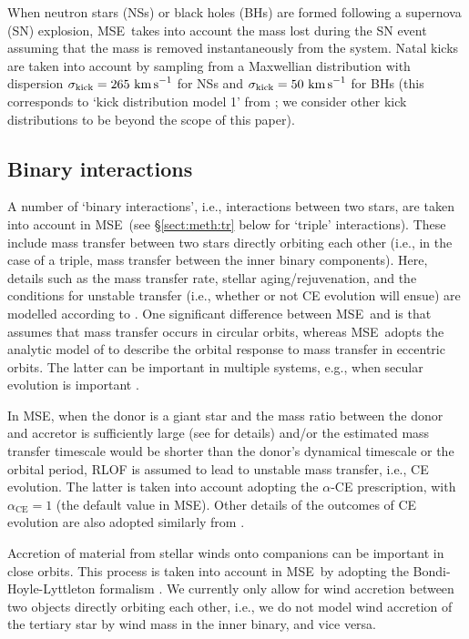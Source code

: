 \documentclass[twocolumn,appendixfloats,tighten]{aastex631}
\newcommand{\kms}{\, {\rm km\, s}^{-1}}
\newcommand{\mse}{\textsc{MSE}}
\begin{document}
When neutron stars (NSs) or black holes (BHs) are formed following a supernova (SN) explosion, \mse~takes into account the mass lost during the SN event assuming that the mass is removed instantaneously from the system. Natal kicks are taken into account by sampling from a Maxwellian distribution with dispersion $\sigma_{\mathrm{kick}} = 265\,\kms$ for NSs \citep{2005MNRAS.360..974H} and $\sigma_{\mathrm{kick}} = 50\,\kms$ for BHs (this corresponds to `kick distribution model 1' from \citealt{2021MNRAS.502.4479H}; we consider other kick distributions to be beyond the scope of this paper).


\subsection{Binary interactions}
\label{sect:meth:bin}
A number of `binary interactions', i.e., interactions between two stars, are taken into account in \mse~(see \S\ref{sect:meth:tr} below for `triple' interactions). These include mass transfer between two stars directly orbiting each other (i.e., in the case of a triple, mass transfer between the inner binary components). Here, details such as the mass transfer rate, stellar aging/rejuvenation, and the conditions for unstable transfer (i.e., whether or not CE evolution will ensue) are modelled according to \citet{2002MNRAS.329..897H}. One significant difference between \mse~and \citet{2002MNRAS.329..897H} is that \citet{2002MNRAS.329..897H} assumes that mass transfer occurs in circular orbits, whereas \mse~adopts the analytic model of \citet{2019ApJ...872..119H} to describe the orbital response to mass transfer in eccentric orbits. The latter can be important in multiple systems, e.g., when secular evolution is important \citep[e.g.,][]{2020A&A...640A..16T}.

In \mse, when the donor is a giant star and the mass ratio between the donor and accretor is sufficiently large (see \citealt{2002MNRAS.329..897H} for details) and/or the estimated mass transfer timescale would be shorter than the donor's dynamical timescale or the orbital period, RLOF is assumed to lead to unstable mass transfer, i.e., CE evolution. The latter is taken into account adopting the $\alpha$-CE prescription, with $\alpha_\mathrm{CE}=1$ (the default value in \mse). Other details of the outcomes of CE evolution are also adopted similarly from \citet{2002MNRAS.329..897H}. 

Accretion of material from stellar winds onto companions can be important in close orbits. This process is taken into account in \mse~by adopting the Bondi-Hoyle-Lyttleton formalism \citep{1939PCPS...35..405H,1944MNRAS.104..273B}. We currently only allow for wind accretion between two objects directly orbiting each other, i.e., we do not model wind accretion of the tertiary star by wind mass in the inner binary, and vice versa.
\end{document}
